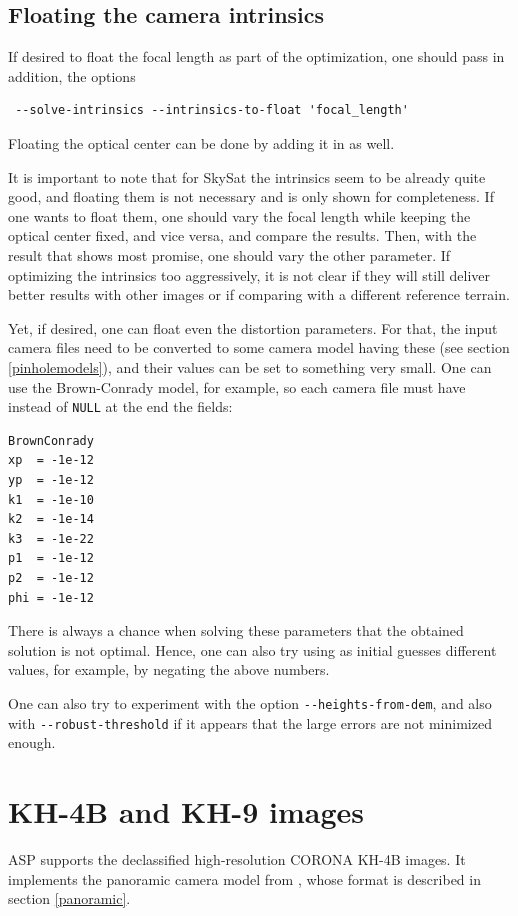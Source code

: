 \subsection{Floating the camera intrinsics}

If desired to float the focal length as part of the optimization, one should 
pass in addition, the options
\begin{verbatim}
 --solve-intrinsics --intrinsics-to-float 'focal_length'
\end{verbatim}
Floating the optical center can be done by adding it in as well. 

It is important to note that for SkySat the intrinsics seem to be already quite good,
and floating them is not necessary and is only shown for completeness. If 
one wants to float them, one should vary the focal length while keeping the optical center
fixed, and vice versa, and compare the results. Then, with the result that shows most
promise, one should vary the other parameter. If optimizing the intrinsics too aggressively,
it is not clear if they will still deliver better results with other images or 
if comparing with a different reference terrain. 

Yet, if desired, one can float even the distortion parameters. 
For that, the input camera files need to be converted
to some camera model having these (see section \ref{pinholemodels}), 
and their values can be set to something very small.
One can use the Brown-Conrady model, for example, so each camera file must have
instead of \texttt{NULL} at the end the fields:
\begin{verbatim}
BrownConrady
xp  = -1e-12
yp  = -1e-12
k1  = -1e-10
k2  = -1e-14
k3  = -1e-22
p1  = -1e-12
p2  = -1e-12
phi = -1e-12
\end{verbatim}

There is always a chance when solving these parameters that the obtained solution is not optimal.
Hence, one can also try using as initial guesses different values, for example, 
by negating the above numbers. 

One can also try to experiment with the option \texttt{-\/-heights-from-dem}, and also with \texttt{-\/-robust-threshold} if it appears that the large errors are not minimized enough.

\section{KH-4B and KH-9 images}
\label{kh4}

ASP supports the declassified high-resolution CORONA KH-4B images. It
implements the panoramic camera model from \cite{sohn2004mathematical},
whose format is described in section \ref{panoramic}. 

